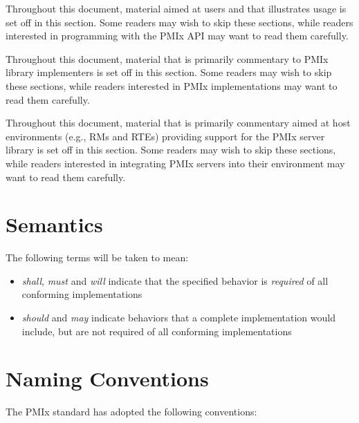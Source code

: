 \adviceuserstart
Throughout this document, material aimed at users and that illustrates usage is set off in this section.
Some readers may wish to skip these sections, while readers interested in programming with the \ac{PMIx} \ac{API} may want to read them carefully.
\adviceuserend

\adviceimplstart
Throughout this document, material that is primarily commentary to \ac{PMIx} library implementers is set off in this section.
Some readers may wish to skip these sections, while readers interested in \ac{PMIx} implementations may want to read them carefully.
\adviceimplend

\advicermstart
Throughout this document, material that is primarily commentary aimed at host environments (e.g., \acp{RM} and \acp{RTE}) providing support for the \ac{PMIx} server library is set off in this section.
Some readers may wish to skip these sections, while readers interested in integrating \ac{PMIx} servers into their environment may want to read them carefully.
\advicermend

\section{Semantics}

The following terms will be taken to mean:

\begin{itemize}
\item \emph{shall}, \emph{must} and \emph{will} indicate that the specified behavior is \emph{required} of all conforming implementations
\item \emph{should} and \emph{may} indicate behaviors that a complete implementation would include, but are not required of all conforming implementations
\end{itemize}

\section{Naming Conventions}

The \ac{PMIx} standard has adopted the following conventions:

